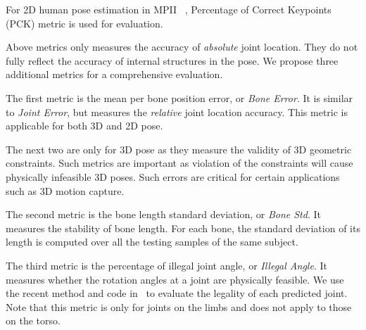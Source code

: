 \documentclass[10pt,twocolumn,letterpaper]{article}
\begin{document}
For 2D human pose estimation in MPII ~\cite{andriluka20142d}, Percentage of Correct Keypoints (PCK) metric is used for evaluation.

Above metrics only measures the accuracy of \emph{absolute} joint location. They do not fully reflect the accuracy of internal structures in the pose. We propose three additional metrics for a comprehensive evaluation.

The first metric is the mean per bone position error, or \emph{Bone Error}. It is similar to \emph{Joint Error}, but measures the \emph{relative} joint location accuracy. This metric is applicable for both 3D and 2D pose.

\begin{comment}
\begin{equation}
\mathbf{MPBPE}  = \dfrac{1}{K}\sum_{k=1}^{K}mean(||\mathbf{B}_k - \mathbf{B}_k^{gt}||_2)
\end{equation}
, where $mean(*)$ is calculated over testing samples.
\end{comment}

The next two are only for 3D pose as they measure the validity of 3D geometric constraints. Such metrics are important as violation of the constraints will cause physically infeasible 3D poses. Such errors are critical for certain applications such as 3D motion capture.

The second metric is the bone length standard deviation, or \emph{Bone Std}. It measures the stability of bone length. For each bone, the standard deviation of its length is computed over all the testing samples of the same subject.

\begin{comment}
\begin{equation}
\begin{split}
& \mathbf{MBLSD}  = \dfrac{1}{K}\sum_{k=1}^{K} std(||\mathbf{B}_k||_2)\\
\end{split}
\end{equation}
, where $std(*)$ is calculated over testing samples.
\end{comment}

The third metric is the percentage of illegal joint angle, or \emph{Illegal Angle}. It measures whether the rotation angles at a joint are physically feasible. We use the recent method and code in~\cite{akhter2015pose} to evaluate the legality of each predicted joint. Note that this metric is only for joints on the limbs and does not apply to those on the torso.
\end{document}
